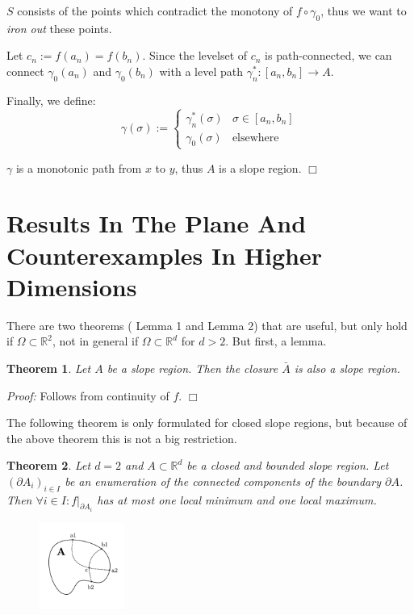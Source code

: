 \documentclass[a4paper,10pt,notitlepage,fullpage]{paper}
\theoremstyle{plain}
\newtheorem{thm}{Theorem}[section] %
\theoremstyle{definition}
\begin{document}
$S$ consists of the points which contradict the monotony of $f \circ \gamma_0$, thus we want to \emph{iron out} these points.

Let $c_n := f(a_n) = f(b_n)$. Since the levelset of $c_n$ is path-connected, we can connect $\gamma_0(a_n)$ and $\gamma_0(b_n)$ with a level path $\gamma_n^* : [a_n, b_n] \to A.$

Finally, we define:
\begin{equation*}
\gamma(\sigma) :=
\begin{cases}
\gamma_n^*(\sigma) & \sigma \in [a_n, b_n] \\
\gamma_0(\sigma) & \text{elsewhere}
\end{cases}
\end{equation*}

$\gamma$ is a monotonic path from $x$ to $y$, thus $A$ is a slope region.
\hfill $\Box$



\section{Results In The Plane And Counterexamples In Higher Dimensions}

There are two theorems (\!\!\cite{kropatsch2019computing} Lemma 1 and \cite{kropatsch2019computing} Lemma 2) that are useful, but only hold if $\Omega \subset \mathbb R^2$, not in general if $\Omega \subset \mathbb R^d$ for $d > 2$.
But first, a lemma.

\begin{thm}
Let $A$ be a slope region.
Then the closure $\bar A$ is also a slope region.
\end{thm}

\emph{Proof:} Follows from continuity of $f$.
\hfill $\Box$

The following theorem is only formulated for closed slope regions, but because of the above theorem this is not a big restriction.

\begin{thm}
Let $d = 2$ and $A \subset \mathbb R^d$ be a closed and bounded slope region.
Let $(\partial A_i)_{i\in I}$ be an enumeration of the connected components of the boundary $\partial A$.
Then $\forall i \in I : f|_{\partial A_i}$ has at most one local minimum and one local maximum.
\end{thm}

\begin{figure}
\centering
\includegraphics[width=0.25\textwidth]{img/sketch_border_thm.pdf}
\label{fig:sketch_1}
\end{figure}
\end{document}
